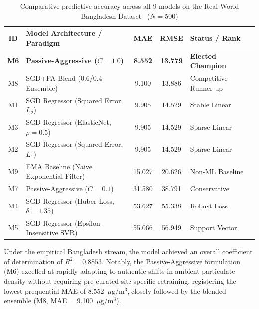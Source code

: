 \begin{table}[htbp]
\centering
\caption{Comparative predictive accuracy across all 9 models on the Real-World Bangladesh Dataset~\cite{paul2026bangladesh} ($N=500$)}
\label{tab:exp-real-comparison}
\small
\setlength{\tabcolsep}{3pt}

\begin{tabularx}{\textwidth}{@{}cXccX@{}}
\toprule
\textbf{ID} &
\textbf{Model Architecture / Paradigm} &
\textbf{MAE} &
\textbf{RMSE} &
\textbf{Status / Rank} \\
\midrule

\textbf{M6} &
\textbf{Passive-Aggressive ($C=1.0$)} &
\textbf{8.552} &
\textbf{13.779} &
\textbf{Elected Champion} \\

M8 &
SGD+PA Blend (0.6/0.4 Ensemble) &
9.100 &
13.886 &
Competitive Runner-up \\

M1 &
SGD Regressor (Squared Error, $L_2$) &
9.905 &
14.529 &
Stable Linear \\

M3 &
SGD Regressor (ElasticNet, $\rho=0.5$) &
9.905 &
14.529 &
Sparse Linear \\

M2 &
SGD Regressor (Squared Error, $L_1$) &
9.905 &
14.529 &
Sparse Linear \\

M9 &
EMA Baseline (Naive Exponential Filter) &
15.027 &
20.626 &
Non-ML Baseline \\

M7 &
Passive-Aggressive ($C=0.1$) &
31.580 &
38.791 &
Conservative \\

M4 &
SGD Regressor (Huber Loss, $\delta=1.35$) &
53.627 &
55.338 &
Robust Loss \\

M5 &
SGD Regressor (Epsilon-Insensitive SVR) &
55.066 &
56.949 &
Support Vector \\

\bottomrule
\end{tabularx}
\end{table}

Under the empirical Bangladesh stream, the model achieved an overall coefficient of determination of $R^2 = 0.8853$. Notably, the Passive-Aggressive formulation (M6) excelled at rapidly adapting to authentic shifts in ambient particulate density without requiring pre-curated site-specific retraining, registering the lowest prequential MAE of 8.552~$\mu$g/m$^3$, closely followed by the blended ensemble (M8, MAE = 9.100~$\mu$g/m$^3$).

